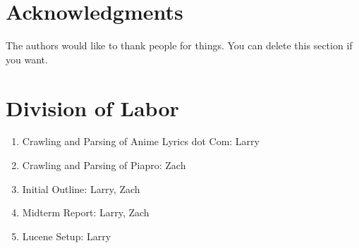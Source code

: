 \documentclass{acm} %
\begin{document}
\begin{CJK}{UTF8}{zhsong}
\section*{Acknowledgments}

The authors would like to thank people for things. You can delete this section
if you want.

\appendix

\section{Division of Labor}

\begin{enumerate}
\item Crawling and Parsing of Anime Lyrics dot Com: Larry
\item Crawling and Parsing of Piapro: Zach
\item Initial Outline: Larry, Zach
\item Midterm Report: Larry, Zach
\item Lucene Setup: Larry
\end{enumerate}



\end{CJK}
\end{document}
